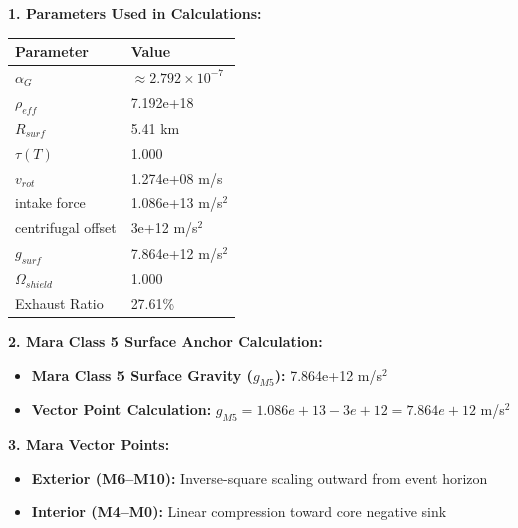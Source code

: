 \documentclass[11pt, a4paper]{article}
\begin{document}
\vspace{0.5em}
\noindent \textbf{1. Parameters Used in Calculations:}
\begin{center}
  \begin{tabular}{|l|l|}
    \hline
    \textbf{Parameter} & \textbf{Value} \\ \hline
    $\alpha_G$ & $\approx 2.792 \times 10^{-7}$ \\ \hline
    $\rho_{eff}$ & 7.192e+18 \\ \hline
    $R_{surf}$ & 5.41 km \\ \hline
    $\tau(T)$ & 1.000 \\ \hline
    $v_{rot}$ & 1.274e+08 m/s \\ \hline
    intake force & 1.086e+13 m/s$^2$ \\ \hline
    centrifugal offset & 3e+12 m/s$^2$ \\ \hline
    $g_{surf}$ & 7.864e+12 m/s$^2$ \\ \hline
    $\Omega_{shield}$ & 1.000 \\ \hline
    Exhaust Ratio & 27.61\% \\ \hline
  \end{tabular}
\end{center}

\vspace{0.5em}
\noindent \textbf{2. Mara Class 5 Surface Anchor Calculation:}
\begin{itemize}
  \item \textbf{Mara Class 5 Surface Gravity ($g_{M5}$):} 7.864e+12 m/s$^2$
  \item \textbf{Vector Point Calculation:} $g_{M5} = 1.086e+13 - 3e+12 = 7.864e+12$ m/s$^2$
\end{itemize}

\vspace{0.5em}
\noindent \textbf{3. Mara Vector Points:}
\begin{itemize}
  \item \textbf{Exterior (M6--M10):} Inverse-square scaling outward from event horizon
  \item \textbf{Interior (M4--M0):} Linear compression toward core negative sink
\end{itemize}
\end{document}
